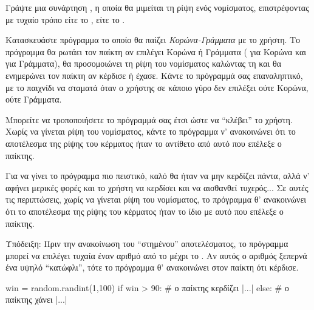 \documentclass[a4paper,11pt,oneside]{book}
\begin{document}
\begin{exercise}
Γράψτε μια συνάρτηση , η οποία θα μιμείται τη ρίψη ενός νομίσματος, επιστρέφοντας με τυχαίο τρόπο είτε το , είτε το .

Κατασκευάστε πρόγραμμα το οποίο θα παίζει \emph{Κορώνα-Γράμματα} με το χρήστη. Το πρόγραμμα θα ρωτάει τον παίκτη αν επιλέγει Κορώνα ή Γράμματα ( για Κορώνα και  για Γράμματα), θα προσομοιώνει τη ρίψη του νομίσματος καλώντας τη  και θα ενημερώνει τον παίκτη αν κέρδισε ή έχασε. Κάντε το πρόγραμμά σας επαναληπτικό, με το παιχνίδι να σταματά όταν ο χρήστης σε κάποιο γύρο δεν επιλέξει ούτε Κορώνα, ούτε Γράμματα.

Μπορείτε να τροποποιήσετε το πρόγραμμά σας έτσι ώστε να ``κλέβει'' το χρήστη. Χωρίς να γίνεται ρίψη του νομίσματος, κάντε το πρόγραμμα ν' ανακοινώνει ότι το αποτέλεσμα της ρίψης του κέρματος ήταν το αντίθετο από αυτό που επέλεξε ο παίκτης.

Για να γίνει το πρόγραμμα πιο πειστικό, καλό θα ήταν να μην κερδίζει πάντα, αλλά ν' αφήνει μερικές φορές και το χρήστη να κερδίσει και να αισθανθεί τυχερός... Σε αυτές τις περιπτώσεις, χωρίς να γίνεται ρίψη του νομίσματος, το πρόγραμμα θ' ανακοινώνει ότι το αποτέλεσμα της ρίψης του κέρματος ήταν το ίδιο με αυτό που επέλεξε ο παίκτης.

\begin{note}
Υπόδειξη: Πριν την ανακοίνωση του ``στημένου'' αποτελέσματος, το πρόγραμμα μπορεί να επιλέγει τυχαία έναν αριθμό από το  μέχρι το . Αν αυτός ο αριθμός ξεπερνά ένα υψηλό ``κατώφλι'', τότε το πρόγραμμα θ' ανακοινώνει στον παίκτη ότι κέρδισε. 

\begin{pynew}
win = random.randint(1,100)
if win > 90:
    # ο παίκτης κερδίζει
    |...|
else:
    # ο παίκτης χάνει
    |...|
\end{pynew}
\end{note}


\end{exercise}
\end{document}
